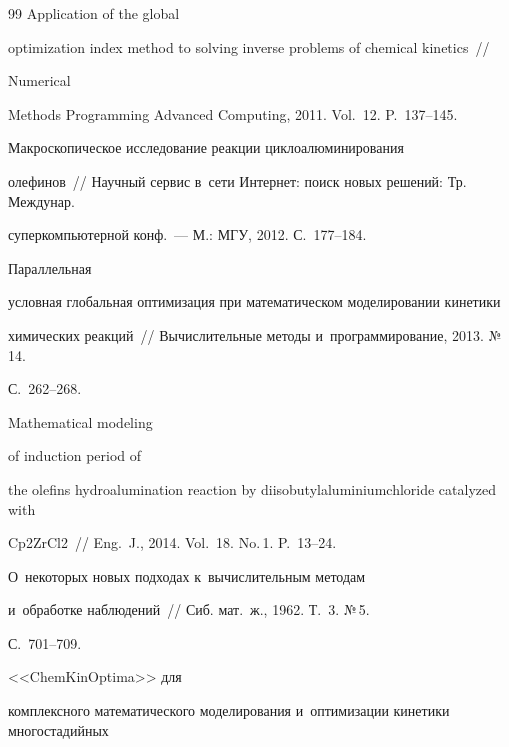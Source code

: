 {{\begin{thebibliography}{99}
  Application of the global 


optimization index method to solving inverse problems of chemical kinetics~/\!\!/ 


Numerical 


Methods Programming Advanced Computing, 2011. Vol.~12. P.~137--145.


 




   Макроскопическое исследование реакции циклоалюминирования 


олефинов~/\!\!/ Научный сервис в~сети Интернет: поиск новых решений: Тр. Междунар. 


суперкомпьютерной конф.~--- М.: МГУ, 2012. С.~177--184.




   Параллельная 


условная глобальная оптимизация при математическом моделировании кинетики 


химических реакций~/\!\!/ Вычислительные методы и~программирование, 2013. №\,14.  


С.~262--268.







   Mathematical modeling 


  of induction period of 


the olefins hydroalumination reaction by diisobutylaluminiumchloride catalyzed with 


Cp2ZrCl2~/\!\!/ Eng.~J., 2014. Vol.~18. No.\,1. P.~13--24.




   О~некоторых новых подходах к~вычислительным методам 


и~обработке наблюдений~/\!\!/ Сиб. мат.~ж., 1962. Т.~3. №\,5.  


С.~701--709.




   <<ChemKinOptima>> для 


комплексного математического моделирования и~оптимизации кинетики многостадийных 



\end{thebibliography}}}
